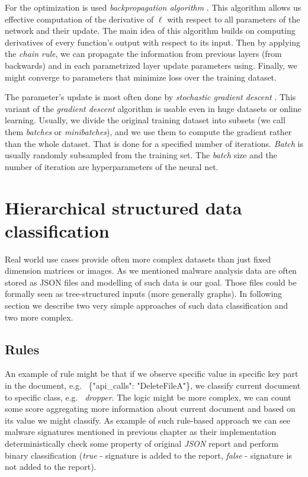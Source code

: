 For the optimization is used \emph{backpropagation algorithm} \cite{Rumelhart1988}. This algorithm allows us effective computation of the derivative of $\ell$ with respect to all parameters of the network and their update. The main idea of this algorithm builds on computing derivatives of every function's output with respect to its input. Then by applying the \emph{chain rule}, we can propagate the information from previous layers (from backwards) and in each parametrized layer update parameters using. Finally, we might converge to parameters that minimize loss over the training dataset. 

The parameter's update is most often done by \emph{stochastic gradient descent} \cite{Kiefer1952}. This variant of the \emph{gradient descent} algorithm is usable even in huge datasets or online learning. Usually, we divide the original training dataset into subsets (we call them \emph{batches} or \emph{minibatches}), and we use them to compute the gradient rather than the whole dataset. That is done for a specified number of iterations. \emph{Batch} is usually randomly subsampled from the training set. The \emph{batch} size and the number of iteration are hyperparameters of the neural net.

\section{Hierarchical structured data classification}
Real world use cases provide often more complex datasets than just fixed dimension matrices or images. As we mentioned malware analysis data are often stored as JSON files and modelling of such data is our goal. Those files could be formally seen as tree-structured inputs (more generally graphs). In following section we describe two very simple approaches of such data classification and two more complex.

\subsection{Rules}
An example of rule might be that if we observe specific value in specific key part in the document, e.g. \ \{"api_calls": "DeleteFileA"\}, we classify current document to specific class, e.g. \ \emph{dropper}. The logic might be more complex, we can count some score aggregating more information about current document and based on its value we might classify. As example of such rule-based approach we can see malware signatures mentioned in previous chapter as their implementation deterministically check some property of original \emph{JSON} report and perform binary classification (\emph{true} - signature is added to the report, \emph{false} - signature is not added to the report).

